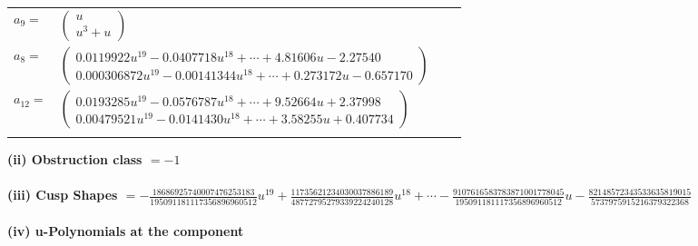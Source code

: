 \documentclass[1p]{elsarticle_modified}
\theoremstyle{definition}
\begin{document}
\begin{tabular}{m{7pt} m{180pt} m{7pt} m{180pt} }
\flushright $a_{9}=$&$\begin{pmatrix}u\\u^3+u\end{pmatrix}$ \\
\flushright $a_{8}=$&$\begin{pmatrix}0.0119922 u^{19}-0.0407718 u^{18}+\cdots+4.81606 u-2.27540\\0.000306872 u^{19}-0.00141344 u^{18}+\cdots+0.273172 u-0.657170\end{pmatrix}$ \\
\flushright $a_{12}=$&$\begin{pmatrix}0.0193285 u^{19}-0.0576787 u^{18}+\cdots+9.52664 u+2.37998\\0.00479521 u^{19}-0.0141430 u^{18}+\cdots+3.58255 u+0.407734\end{pmatrix}$\\&\end{tabular}
\flushleft \textbf{(ii) Obstruction class $= -1$}\\~\\
\flushleft \textbf{(iii) Cusp Shapes $= -\frac{18686925740007476253183}{195091181117356896960512} u^{19}+\frac{11735621234030037886189}{48772795279339224240128} u^{18}+\cdots-\frac{9107616583783871001778045}{195091181117356896960512} u-\frac{82148572343533635819015}{5737975915216379322368}$}\\~\\
\newpage\renewcommand{\arraystretch}{1}
\flushleft \textbf{(iv) u-Polynomials at the component}\newline \\
\end{document}
